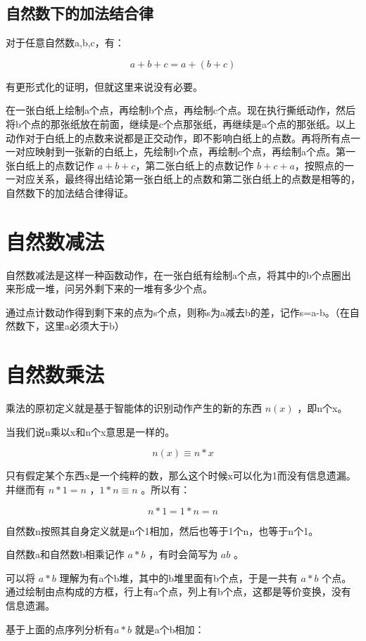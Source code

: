 \documentclass[12pt,oneside]{book}
\begin{document}
\subsection{自然数下的加法结合律}
对于任意自然数a,b,c，有：

\begin{equation}
a + b + c = a + (b + c)
\end{equation}

有更形式化的证明，但就这里来说没有必要。

在一张白纸上绘制a个点，再绘制b个点，再绘制c个点。现在执行撕纸动作，然后将b个点的那张纸放在前面，继续是c个点那张纸，再继续是a个点的那张纸。以上动作对于白纸上的点数来说都是正交动作，即不影响白纸上的点数。再将所有点一一对应映射到一张新的白纸上，先绘制b个点，再绘制c个点，再绘制a个点。第一张白纸上的点数记作 $a+b+c$，第二张白纸上的点数记作 $b+c+a$，按照点的一一对应关系，最终得出结论第一张白纸上的点数和第二张白纸上的点数是相等的，自然数下的加法结合律得证。

\section{自然数减法}
自然数减法是这样一种函数动作，在一张白纸有绘制a个点，将其中的b个点圈出来形成一堆，问另外剩下来的一堆有多少个点。

通过点计数动作得到剩下来的点为s个点，则称s为a减去b的差，记作s=a-b。（在自然数下，这里a必须大于b）



\section{自然数乘法}
乘法的原初定义就是基于智能体的识别动作产生的新的东西 $n(x)$ ，即n个x。

当我们说n乘以x和n个x意思是一样的。

\[
n(x) \equiv n*x
\]

只有假定某个东西x是一个纯粹的数，那么这个时候x可以化为1而没有信息遗漏。并继而有 $n*1 = n$ ，$1*n \equiv n$ 。所以有：

\[
n*1 = 1*n =n
\]

自然数n按照其自身定义就是n个1相加，然后也等于1个n，也等于n个1。

自然数a和自然数b相乘记作 $a*b$ ，有时会简写为 $ab$ 。

可以将 $a*b$ 理解为有a个b堆，其中的b堆里面有b个点，于是一共有 $a*b$ 个点。\cite{什么是数学}通过绘制由点构成的方框，行上有a个点，列上有b个点，这都是等价变换，没有信息遗漏。

基于上面的点序列分析有$a*b$ 就是a个b相加：
\end{document}
